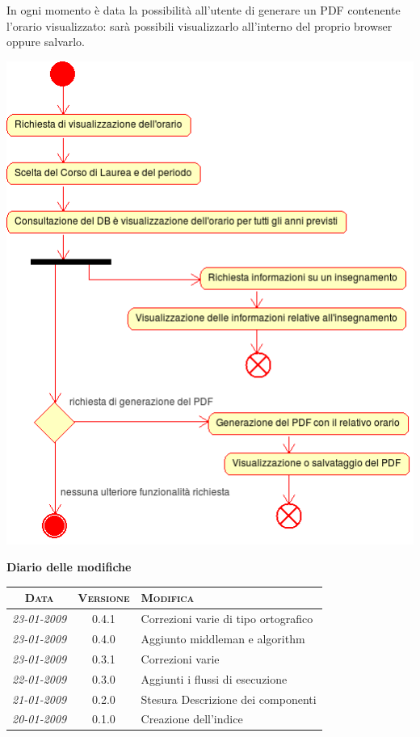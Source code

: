 \documentclass[11pt,a4paper]{article}
\newcommand{\modifiche} 
{
\newpage
\begin{center}
\textbf{Diario delle modifiche} \\
\bigskip
\begin{tabular}{|c|c|p{0.62\textwidth}|}
\hline
\textsc{Data} & \textsc{Versione} & \textsc{Modifica} \\
\hline
\hline
\textit{23-01-2009} & 0.4.1 & Correzioni varie di tipo ortografico\\
\hline
\textit{23-01-2009} & 0.4.0 & Aggiunto middleman e algorithm \\
\hline
\textit{23-01-2009} & 0.3.1 & Correzioni varie \\
\hline
\textit{22-01-2009} & 0.3.0 & Aggiunti i flussi di esecuzione \\
\hline
\textit{21-01-2009} & 0.2.0 & Stesura Descrizione dei componenti \\
\hline
\textit{20-01-2009} & 0.1.0 & Creazione dell'indice \\
\hline
\end{tabular}
\end{center}
}
\begin{document}
In ogni momento è data la possibilità all'utente di generare un PDF contenente l'orario visualizzato: sarà possibili visualizzarlo all'interno del proprio browser oppure salvarlo.
\begin{center}
 \includegraphics[scale=0.85]{images/consultazione_orario.png}
\end{center}

\modifiche
\end{document}
